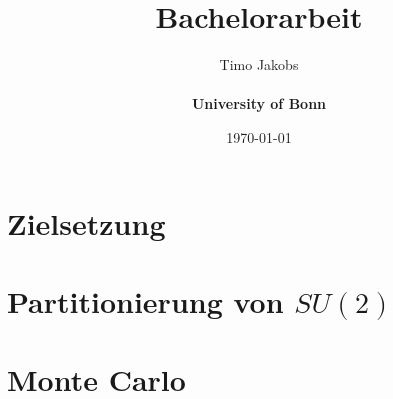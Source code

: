 \documentclass[a4paper]{scrartcl}
\title{Bachelorarbeit}
\author{Timo Jakobs \\\\ \textbf{University of Bonn}}
\date{\today}
\begin{document}
\maketitle
\tableofcontents
\newpage

\section{Zielsetzung}

\section{Partitionierung von $SU(2)$}


\section{Monte Carlo}

\end{document}
